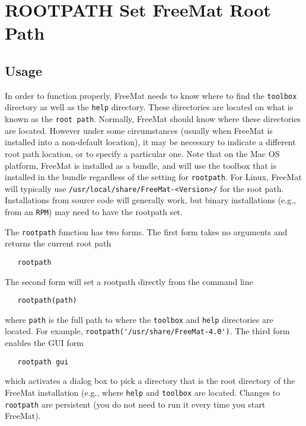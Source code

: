 \section{ROOTPATH Set FreeMat Root Path}

\subsection{Usage}

In order to function properly, FreeMat needs to know where to
find the \verb|toolbox| directory as well as the \verb|help| directory.
These directories are located on what is known as the \verb|root path|.
Normally, FreeMat should know where these directories are located.
However under some circumstances (usually when FreeMat is installed
into a non-default location), it may be necessary to indicate
a different root path location, or to specify a particular one.
Note that on the Mac OS platform, FreeMat is installed as a bundle,
and will use the toolbox that is installed in the bundle regardless of
the setting for \verb|rootpath|.
For Linux, FreeMat will typically use \verb|/usr/local/share/FreeMat-<Version>/|
for the root path.  Installations from source code will generally work,
but binary installations (e.g., from an \verb|RPM|) may need to have the
rootpath set.

The \verb|rootpath| function has two forms.  The first form takes no arguments
and returns the current root path
\begin{verbatim}
   rootpath
\end{verbatim}
The second form will set a rootpath directly from the command line
\begin{verbatim}
   rootpath(path)
\end{verbatim}
where \verb|path| is the full path to where the \verb|toolbox| and \verb|help| 
directories are located.  For example, \verb|rootpath('/usr/share/FreeMat-4.0')|.
The third form enables the GUI form 
\begin{verbatim}
   rootpath gui
\end{verbatim}
which activates a dialog box to pick a directory that is the root directory
of the FreeMat installation (e.g., where \verb|help| and \verb|toolbox| are located.
Changes to \verb|rootpath| are persistent (you do not need to run it every
time you start FreeMat).

